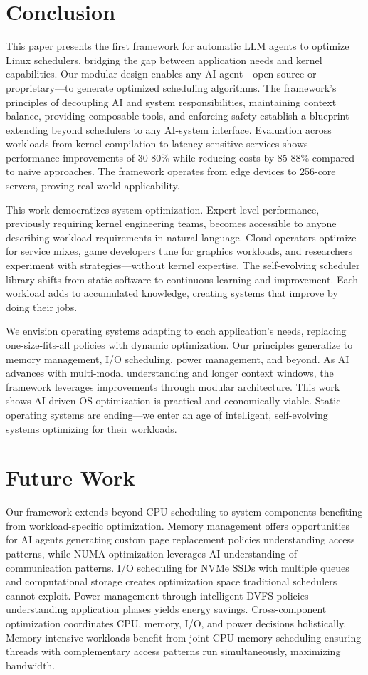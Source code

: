 \section{Conclusion}

This paper presents the first framework for automatic LLM agents to optimize Linux schedulers, bridging the gap between application needs and kernel capabilities. Our modular design enables any AI agent—open-source or proprietary—to generate optimized scheduling algorithms. The framework's principles of decoupling AI and system responsibilities, maintaining context balance, providing composable tools, and enforcing safety establish a blueprint extending beyond schedulers to any AI-system interface. Evaluation across workloads from kernel compilation to latency-sensitive services shows performance improvements of 30-80\% while reducing costs by 85-88\% compared to naive approaches. The framework operates from edge devices to 256-core servers, proving real-world applicability.

This work democratizes system optimization. Expert-level performance, previously requiring kernel engineering teams, becomes accessible to anyone describing workload requirements in natural language. Cloud operators optimize for service mixes, game developers tune for graphics workloads, and researchers experiment with strategies—without kernel expertise. The self-evolving scheduler library shifts from static software to continuous learning and improvement. Each workload adds to accumulated knowledge, creating systems that improve by doing their jobs.

We envision operating systems adapting to each application's needs, replacing one-size-fits-all policies with dynamic optimization. Our principles generalize to memory management, I/O scheduling, power management, and beyond. As AI advances with multi-modal understanding and longer context windows, the framework leverages improvements through modular architecture. This work shows AI-driven OS optimization is practical and economically viable. Static operating systems are ending—we enter an age of intelligent, self-evolving systems optimizing for their workloads.

\section{Future Work}

Our framework extends beyond CPU scheduling to system components benefiting from workload-specific optimization. Memory management offers opportunities for AI agents generating custom page replacement policies understanding access patterns, while NUMA optimization leverages AI understanding of communication patterns. I/O scheduling for NVMe SSDs with multiple queues and computational storage creates optimization space traditional schedulers cannot exploit. Power management through intelligent DVFS policies understanding application phases yields energy savings. Cross-component optimization coordinates CPU, memory, I/O, and power decisions holistically. Memory-intensive workloads benefit from joint CPU-memory scheduling ensuring threads with complementary access patterns run simultaneously, maximizing bandwidth.

